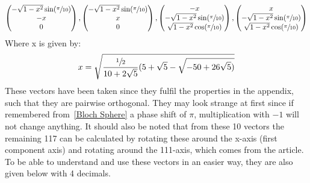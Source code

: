 \begin{equation*}
\begin{pmatrix}
-\sqrt{1-x^2}\sin(\sfrac{\pi}{10})\\
-x\\
0\\
\end{pmatrix}
,
\begin{pmatrix}
-\sqrt{1-x^2}\sin(\sfrac{\pi}{10})\\
x\\
0\\
\end{pmatrix}
,
\begin{pmatrix}
-x\\
-\sqrt{1-x^2}\sin(\sfrac{\pi}{10})\\
\sqrt{1-x^2}\cos(\sfrac{\pi}{10})\\
\end{pmatrix}
,
\begin{pmatrix}
x\\
-\sqrt{1-x^2}\sin(\sfrac{\pi}{10})\\
\sqrt{1-x^2}\cos(\sfrac{\pi}{10})\\
\end{pmatrix}
\end{equation*}
Where x is given by:\\
\begin{equation*}
x=\sqrt{\frac{\sfrac{1}{2}}{10+2\sqrt{5}}(5+\sqrt{5}-\sqrt{-50+26\sqrt{5})}}
\end{equation*}
These vectors have been taken since they fulfil the properties in the appendix, such that they are pairwise orthogonal. They may look strange at first since if remembered from~\ref{Bloch Sphere} a phase shift of $\pi$, multiplication with $-1$ will not change anything. It should also be noted that from these 10 vectors the remaining 117 can be calculated by rotating these around the x-axis (first component axis) and rotating around the 111-axis, which comes from the article. To be able to understand and use these vectors in an easier way, they are also given below with 4 decimals.\\
